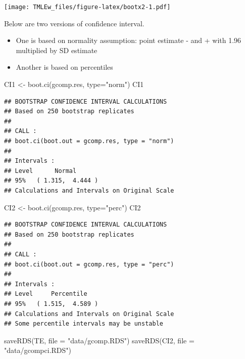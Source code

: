\documentclass[
]{book}
\newenvironment{Shaded}{\begin{snugshade}}{\end{snugshade}}
\newcommand{\AttributeTok}[1]{\textcolor[rgb]{0.77,0.63,0.00}{#1}}
\newcommand{\FunctionTok}[1]{\textcolor[rgb]{0.00,0.00,0.00}{#1}}
\newcommand{\NormalTok}[1]{#1}
\newcommand{\OtherTok}[1]{\textcolor[rgb]{0.56,0.35,0.01}{#1}}
\newcommand{\StringTok}[1]{\textcolor[rgb]{0.31,0.60,0.02}{#1}}
\providecommand{\tightlist}{%
  \setlength{\itemsep}{0pt}\setlength{\parskip}{0pt}}
\begin{document}
\texttt{[image: TMLEw\_files/figure-latex/bootx2-1.pdf]}

Below are two versions of confidence interval.

\begin{itemize}
\tightlist
\item
  One is based on normality assumption: point estimate - and + with 1.96 multiplied by SD estimate
\item
  Another is based on percentiles
\end{itemize}

\begin{Shaded}
\begin{Highlighting}[]
\NormalTok{CI1 }\OtherTok{\textless{}{-}} \FunctionTok{boot.ci}\NormalTok{(gcomp.res, }\AttributeTok{type=}\StringTok{"norm"}\NormalTok{) }
\NormalTok{CI1}
\end{Highlighting}
\end{Shaded}

\begin{verbatim}
## BOOTSTRAP CONFIDENCE INTERVAL CALCULATIONS
## Based on 250 bootstrap replicates
## 
## CALL : 
## boot.ci(boot.out = gcomp.res, type = "norm")
## 
## Intervals : 
## Level      Normal        
## 95%   ( 1.315,  4.444 )  
## Calculations and Intervals on Original Scale
\end{verbatim}

\begin{Shaded}
\begin{Highlighting}[]
\NormalTok{CI2 }\OtherTok{\textless{}{-}} \FunctionTok{boot.ci}\NormalTok{(gcomp.res, }\AttributeTok{type=}\StringTok{"perc"}\NormalTok{)}
\NormalTok{CI2}
\end{Highlighting}
\end{Shaded}

\begin{verbatim}
## BOOTSTRAP CONFIDENCE INTERVAL CALCULATIONS
## Based on 250 bootstrap replicates
## 
## CALL : 
## boot.ci(boot.out = gcomp.res, type = "perc")
## 
## Intervals : 
## Level     Percentile     
## 95%   ( 1.515,  4.589 )  
## Calculations and Intervals on Original Scale
## Some percentile intervals may be unstable
\end{verbatim}

\begin{Shaded}
\begin{Highlighting}[]
\FunctionTok{saveRDS}\NormalTok{(TE, }\AttributeTok{file =} \StringTok{"data/gcomp.RDS"}\NormalTok{)}
\FunctionTok{saveRDS}\NormalTok{(CI2, }\AttributeTok{file =} \StringTok{"data/gcompci.RDS"}\NormalTok{)}
\end{Highlighting}
\end{Shaded}
\end{document}
